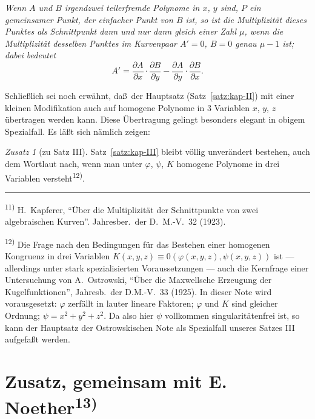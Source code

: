 \documentclass[12pt,a4paper]{article}
\theoremstyle{plain}
\theoremstyle{definition}
\theoremstyle{remark}
\newtheorem*{zusatz}{Zusatz}
\begin{document}
\smallskip
\textit{Wenn $A$ und $B$ irgendzwei teilerfremde Polynome in $x$, $y$
sind, $P$ ein gemeinsamer Punkt, der einfacher Punkt von $B$ ist, so
ist die Multiplizit\"at dieses Punktes als Schnittpunkt dann und nur
dann gleich einer Zahl $\mu$, wenn die Multiplizit\"at desselben
Punktes im Kurvenpaar $A' = 0$, $B = 0$ genau $\mu - 1$ ist; dabei
bedeutet}
\[
A' = \frac{\partial A}{\partial x} \cdot \frac{\partial B}{\partial y} -
\frac{\partial A}{\partial y} \cdot \frac{\partial B}{\partial x}.
\]

Schlie\ss lich sei noch erw\"ahnt, da\ss\ der Hauptsatz (Satz~\ref{satz:kap-II})
mit einer kleinen Modifikation auch auf homogene Polynome in 3
Variablen $x$, $y$, $z$ \"ubertragen werden kann. Diese \"Ubertragung
gelingt besonders elegant in obigem Spezialfall. Es l\"a\ss t sich
n\"amlich zeigen:

\begin{zusatz}[zu Satz III]
Satz~\ref{satz:kap-III} bleibt v\"ollig unver\"andert bestehen, auch dem
Wortlaut nach, wenn man unter $\varphi$, $\psi$, $K$ homogene Polynome
in drei Variablen versteht\textsuperscript{12)}.
\end{zusatz}

\vspace{0.5em}
\noindent\rule{\textwidth}{0.4pt}
\vspace{0.3em}

{\footnotesize
\textsuperscript{11)} H.\ Kapferer, ``\"Uber die Multiplizit\"at der Schnittpunkte von zwei algebraischen
Kurven''. Jahresber.\ der D.\ M.-V.\ 32 (1923).

\textsuperscript{12)} Die Frage nach den Bedingungen f\"ur das Bestehen einer homogenen Kongruenz in
drei Variablen $K(x,y,z) \equiv 0(\varphi(x,y,z), \psi(x,y,z))$ ist --- allerdings
unter stark spezialisierten Voraussetzungen --- auch die Kernfrage einer
Untersuchung von A.\ Ostrowski, ``\"Uber die Maxwellsche Erzeugung der
Kugelfunktionen'', Jahresb.\ der D.M.-V.\ 33 (1925). In dieser Note wird
vorausgesetzt: $\varphi$ zerf\"allt in lauter lineare Faktoren; $\varphi$ und $K$ sind
gleicher Ordnung; $\psi = x^{2} + y^{2} + z^{2}$. Da also hier $\psi$ vollkommen
singularit\"atenfrei ist, so kann der Hauptsatz der Ostrowskischen Note als
Spezialfall unseres Satzes III aufgefa\ss t werden.
}

\newpage
\section*{Zusatz, gemeinsam mit E. Noether\textsuperscript{13)}}
\end{document}
